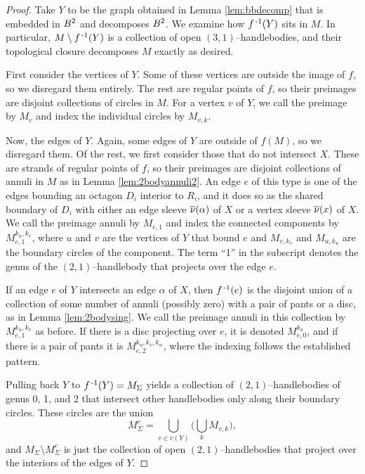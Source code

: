 \begin{proof}
	Take $Y$ to be the graph obtained in Lemma \ref{lem:bbdecomp} that is embedded in $B^2$ and decomposes $B^2$.
	We examine how $f^{\,\text{-}1}(Y)$ sits in $M$.
	In particular, $M\setminus f^{\,\text{-}1}(Y)$ is a collection of open $(3,1)$--handlebodies, and their topological closure decomposes $M$ exactly as desired.
	
	First consider the vertices of $Y$.
	Some of these vertices are outside the image of $f$, so we disregard them entirely.
	The rest are regular points of $f$, so their preimages are disjoint collections of circles in $M$.
	For a vertex $v$ of $Y$, we call the preimage by $M_v$ and index the individual circles by $M_{v,k}$.
	
	Now, the edges of $Y$.
	Again, some edges of $Y$ are outside of $f(M)$, so we disregard them.
	Of the rest, we first consider those that do not intersect $X$.
	These are strands of regular points of $f$, so their preimages are disjoint collections of annuli in $M$ as in Lemma \ref{lem:2bodyannuli2}.
	An edge $e$ of this type is one of the edges bounding an octagon $D_i$ interior to $R_i$, and it does so as the shared boundary of $D_i$ with either an edge sleeve $\overline{\nu}(\alpha)$ of $X$ or a vertex sleeve $\overline{\nu}(x)$ of $X$.
	We call the preimage annuli by $M_{e,1}$ and index the connected components by $M_{e,1}^{k_u,k_v}$, where $u$ and $v$ are the vertices of $Y$ that bound $e$ and $M_{v,k_v}$ and $M_{u,k_u}$ are the boundary circles of the component.
	The term ``1'' in the subscript denotes the genus of the $(2,1)$--handlebody that projects over the edge $e$.
	
	If an edge $e$ of $Y$ intersects an edge $\alpha$ of $X$, then $f^{\,\text{-}1}(e)$ is the disjoint union of a collection of some number of annuli (possibly zero) with a pair of pants or a disc, as in Lemma \ref{lem:2bodysing}.
	We call the preimage annuli in this collection by $M_{e,1}^{k_u,k_v}$ as before.
	If there is a disc projecting over $e$, it is denoted $M_{e,0}^{k_u}$, and if there is a pair of pants it is $M_{e,2}^{k_u,k_v,k_w}$, where the indexing follows the established pattern.
	
	Pulling back $Y$ to $f^{\,\text{-}1}(Y)=M_\Sigma$ yields a collection of $(2,1)$--handlebodies of genus 0, 1, and 2 that intersect other handlebodies only along their boundary circles.
	These circles are the union
	\[
		M_\Sigma^c = \bigcup_{v\in v(Y)}\Big( \bigcup_k M_{v,k}\Big),
	\]
	and $M_\Sigma\setminus M_\Sigma^c$ is just the collection of open $(2,1)$--handlebodies that project over the interiors of the edges of $Y$.
	

\end{proof}
